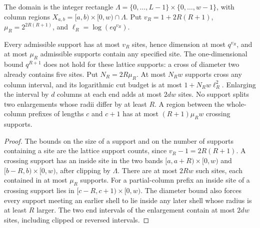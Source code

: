 \begin{definition}
    \label{def:strip_column_model}
    \leanok
    The domain is the integer rectangle
    $\Lambda=\{0,\ldots,L-1\}\times\{0,\ldots,w-1\}$,
    with column regions $X_{a,b}=\lbrack a,b)\times\lbrack 0,w)\cap\Lambda$.
    Put $v_R=1+2R(R+1)$, $\mu_R=2^{2R(R+1)}$, and
    $\ell_R=\log(e q^{v_R})$.
\end{definition}

\begin{lemma}
    \label{lem:strip_column_geometry}
    \leanok
    Every admissible support has at most $v_R$ sites, hence dimension at
    most $q^{v_R}$, and at most $\mu_R$ admissible supports contain any
    specified site. The one-dimensional bound $q^{R+1}$ does not hold for
    these lattice supports: a cross of diameter two already contains five
    sites. Put $N_R=2R\mu_R$. At most $N_Rw$ supports cross any column interval,
    and its logarithmic cut budget is at most $1+N_Rw\ell_R^2$.
    Enlarging the interval by $d$ columns at each end adds at most $2dw$
    sites. No support splits two enlargements whose radii differ by at
    least $R$. A region between the whole-column prefixes of lengths $c$
    and $c+1$ has at most $(R+1)\mu_Rw$ crossing supports.
\end{lemma}
\begin{proof}
    \leanok
    The bounds on the size of a support and on the number of supports
    containing a site are the lattice support counts, since $v_R-1=2R(R+1)$.
    A crossing support has an inside site in the two bands
    $\lbrack a,a+R)\times\lbrack 0,w)$ and $\lbrack b-R,b)\times\lbrack 0,w)$, after clipping by
    $\Lambda$. There are at most $2Rw$ such sites, each contained in at
    most $\mu_R$ supports. For a partial-column prefix an inside site of
    a crossing support lies in $\lbrack c-R,c+1)\times\lbrack 0,w)$.
    The diameter bound also forces every support meeting an earlier
    shell to lie inside any later shell whose radius is at least $R$
    larger. The two end intervals of the enlargement contain at most
    $2dw$ sites, including clipped or reversed intervals.
\end{proof}


